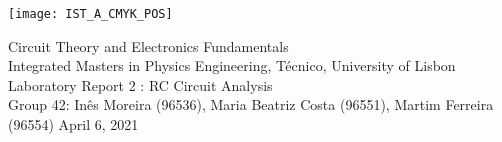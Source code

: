 
\thispagestyle {empty}

\texttt{[image: IST\_A\_CMYK\_POS]}

\begin{center}
%
\vspace{1.0cm}

\vspace{1cm}
{\FontLb Circuit Theory and Electronics Fundamentals} \\ %
\vspace{1cm}
{\FontSn Integrated Masters in Physics Engineering, Técnico, University of Lisbon} \\ %
\vspace{1cm}
{\FontSn Laboratory Report 2 : RC Circuit Analysis} \\
\vspace{1cm}
{\FontSn Group 42: Inês Moreira (96536), Maria Beatriz Costa (96551), Martim Ferreira (96554)}
\vspace{1cm}
{\FontSn April 6, 2021} \\ %
%
\end{center}


